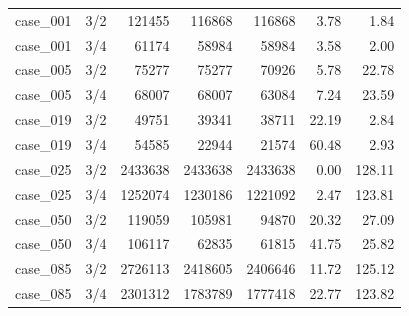 \begin{tabular}{llrrrrr}
case\_001 & 3/2 & 121455 & 116868 & 116868 & 3.78 & 1.84 \\
case\_001 & 3/4 & 61174 & 58984 & 58984 & 3.58 & 2.00 \\
case\_005 & 3/2 & 75277 & 75277 & 70926 & 5.78 & 22.78 \\
case\_005 & 3/4 & 68007 & 68007 & 63084 & 7.24 & 23.59 \\
case\_019 & 3/2 & 49751 & 39341 & 38711 & 22.19 & 2.84 \\
case\_019 & 3/4 & 54585 & 22944 & 21574 & 60.48 & 2.93 \\
case\_025 & 3/2 & 2433638 & 2433638 & 2433638 & 0.00 & 128.11 \\
case\_025 & 3/4 & 1252074 & 1230186 & 1221092 & 2.47 & 123.81 \\
case\_050 & 3/2 & 119059 & 105981 & 94870 & 20.32 & 27.09 \\
case\_050 & 3/4 & 106117 & 62835 & 61815 & 41.75 & 25.82 \\
case\_085 & 3/2 & 2726113 & 2418605 & 2406646 & 11.72 & 125.12 \\
case\_085 & 3/4 & 2301312 & 1783789 & 1777418 & 22.77 & 123.82 \\
\bottomrule
\end{tabular}

